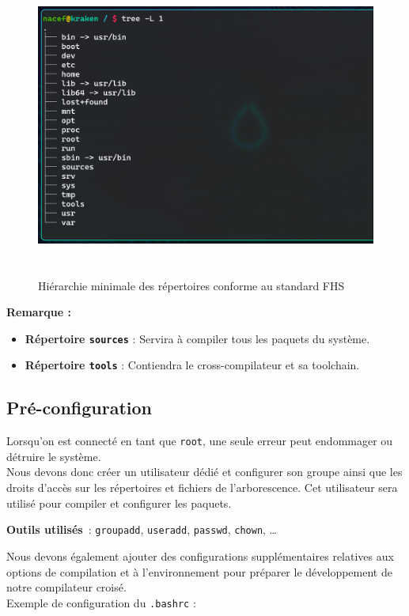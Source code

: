 \begin{figure}[H]
  \centering
  \includegraphics[width=1\textwidth, height=10cm]{images_pfe/minimalfhs.png}
  \caption{Hiérarchie minimale des répertoires conforme au standard FHS}
  \label{fig:minimlfhs}
\end{figure}

\textbf{Remarque :}  
\begin{itemize}
  \item \textbf{Répertoire \texttt{sources}} :  
        Servira à compiler tous les paquets du système.
  \item \textbf{Répertoire \texttt{tools}} :  
        Contiendra le cross-compilateur et sa toolchain.
\end{itemize}

\subsection{Pré-configuration}
Lorsqu’on est connecté en tant que \texttt{root}, une seule erreur peut endommager ou détruire le système. \\Nous devons donc créer un utilisateur dédié et configurer son groupe ainsi que les droits d’accès sur les répertoires et fichiers de l’arborescence. Cet utilisateur sera utilisé pour compiler et configurer les paquets.

\textbf{Outils utilisés}~:  
\texttt{groupadd}, \texttt{useradd}, \texttt{passwd}, \texttt{chown}, \ldots 

Nous devons également ajouter des configurations supplémentaires relatives aux options de compilation et à l’environnement pour préparer le développement de notre compilateur croisé.\\
\clearpage
Exemple de configuration du \texttt{.bashrc} :

